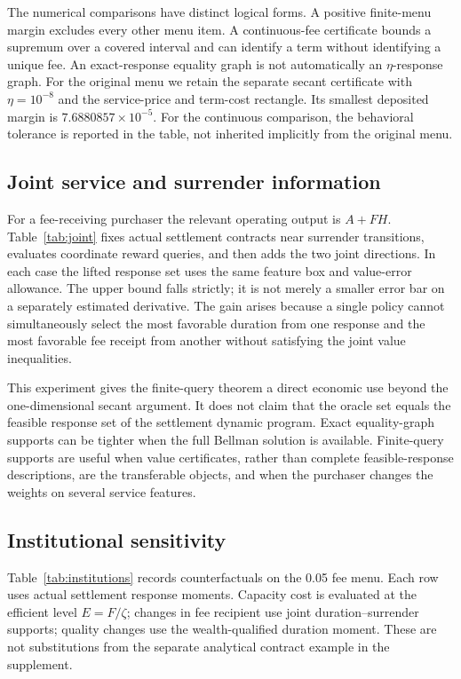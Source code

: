 The numerical comparisons have distinct logical forms. A positive finite-menu margin excludes every other menu item. A continuous-fee certificate bounds a supremum over a covered interval and can identify a term without identifying a unique fee. An exact-response equality graph is not automatically an $\eta$-response graph. For the original menu we retain the separate secant certificate with $\eta=10^{-8}$ and the service-price and term-cost rectangle. Its smallest deposited margin is $7.6880857\times10^{-5}$. For the continuous comparison, the behavioral tolerance is reported in the table, not inherited implicitly from the original menu.

\subsection{Joint service and surrender information}
For a fee-receiving purchaser the relevant operating output is $A+FH$. Table~\ref{tab:joint} fixes actual settlement contracts near surrender transitions, evaluates coordinate reward queries, and then adds the two joint directions. In each case the lifted response set uses the same feature box and value-error allowance. The upper bound falls strictly; it is not merely a smaller error bar on a separately estimated derivative. The gain arises because a single policy cannot simultaneously select the most favorable duration from one response and the most favorable fee receipt from another without satisfying the joint value inequalities.


This experiment gives the finite-query theorem a direct economic use beyond the one-dimensional secant argument. It does not claim that the oracle set equals the feasible response set of the settlement dynamic program. Exact equality-graph supports can be tighter when the full Bellman solution is available. Finite-query supports are useful when value certificates, rather than complete feasible-response descriptions, are the transferable objects, and when the purchaser changes the weights on several service features.

\subsection{Institutional sensitivity}
Table~\ref{tab:institutions} records counterfactuals on the 0.05 fee menu. Each row uses actual settlement response moments. Capacity cost is evaluated at the efficient level $E=F/\zeta$; changes in fee recipient use joint duration--surrender supports; quality changes use the wealth-qualified duration moment. These are not substitutions from the separate analytical contract example in the supplement.


